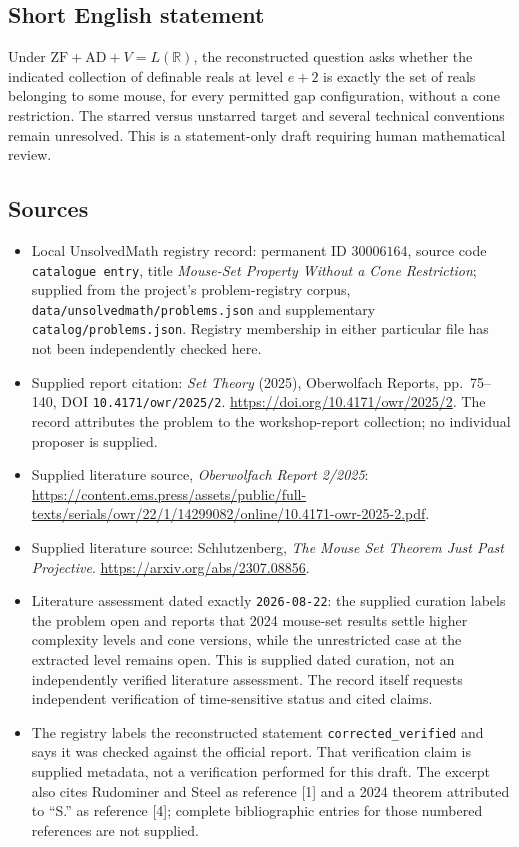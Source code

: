 \documentclass[11pt]{article}
\begin{document}
\subsection{Short English statement}
Under \(\mathrm{ZF}+\mathrm{AD}+V=L(\mathbb R)\), the reconstructed question asks whether the indicated collection of definable reals at level \(e+2\) is exactly the set of reals belonging to some mouse, for every permitted gap configuration, without a cone restriction. The starred versus unstarred target and several technical conventions remain unresolved. This is a statement-only draft requiring human mathematical review.
\subsection{Sources}
\begin{itemize}
\item Local UnsolvedMath registry record: permanent ID \(30006164\), source code \texttt{catalogue entry}, title \emph{Mouse-Set Property Without a Cone Restriction}; supplied from the project's problem-registry corpus, \texttt{data/unsolvedmath/problems.json} and supplementary \texttt{catalog/problems.json}. Registry membership in either particular file has not been independently checked here.
\item Supplied report citation: \emph{Set Theory} (2025), Oberwolfach Reports, pp.~75--140, DOI \texttt{10.4171/owr/2025/2}. \url{https://doi.org/10.4171/owr/2025/2}. The record attributes the problem to the workshop-report collection; no individual proposer is supplied.
\item Supplied literature source, \emph{Oberwolfach Report 2/2025}: \url{https://content.ems.press/assets/public/full-texts/serials/owr/22/1/14299082/online/10.4171-owr-2025-2.pdf}.
\item Supplied literature source: Schlutzenberg, \emph{The Mouse Set Theorem Just Past Projective}. \url{https://arxiv.org/abs/2307.08856}.
\item Literature assessment dated exactly \texttt{2026-08-22}: the supplied curation labels the problem open and reports that 2024 mouse-set results settle higher complexity levels and cone versions, while the unrestricted case at the extracted level remains open. This is supplied dated curation, not an independently verified literature assessment. The record itself requests independent verification of time-sensitive status and cited claims.
\item The registry labels the reconstructed statement \texttt{corrected\_verified} and says it was checked against the official report. That verification claim is supplied metadata, not a verification performed for this draft. The excerpt also cites Rudominer and Steel as reference [1] and a 2024 theorem attributed to ``S.'' as reference [4]; complete bibliographic entries for those numbered references are not supplied.
\end{itemize}
\end{document}
